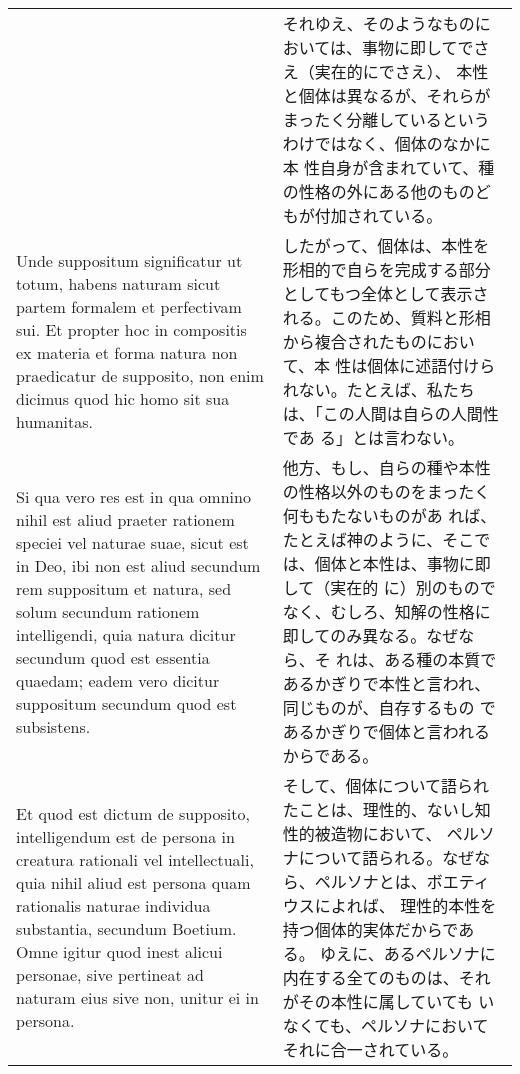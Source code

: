 \documentclass[10pt]{jsarticle} %
\begin{document}
\begin{longtable}{p{21em}p{21em}}
&

それゆえ、そのようなものにおいては、事物に即してでさえ（実在的にでさえ）、
 本性と個体は異なるが、それらがまったく分離しているというわけではなく、個体のなかに本
 性自身が含まれていて、種の性格の外にある他のものどもが付加されている。


\\

Unde suppositum significatur ut
totum, habens naturam sicut partem formalem et perfectivam sui. Et
propter hoc in compositis ex materia et forma natura non praedicatur de
supposito, non enim dicimus quod hic homo sit sua humanitas. 

&

したがって、個体は、本性を形相的で自らを完成する部分としてもつ全体として表示される。このため、質料と形相から複合されたものにおいて、本
 性は個体に述語付けられない。たとえば、私たちは、「この人間は自らの人間性であ
 る」とは言わない。


\\

Si qua vero
res est in qua omnino nihil est aliud praeter rationem speciei vel
naturae suae, sicut est in Deo, ibi non est aliud secundum rem
suppositum et natura, sed solum secundum rationem intelligendi, quia
natura dicitur secundum quod est essentia quaedam; eadem vero dicitur
suppositum secundum quod est subsistens. 


&

他方、もし、自らの種や本性の性格以外のものをまったく何ももたないものがあ
 れば、たとえば神のように、そこでは、個体と本性は、事物に即して（実在的
 に）別のものでなく、むしろ、知解の性格に即してのみ異なる。なぜなら、そ
 れは、ある種の本質であるかぎりで本性と言われ、同じものが、自存するもの
 であるかぎりで個体と言われるからである。


\\

Et quod est dictum de
supposito, intelligendum est de persona in creatura rationali vel
intellectuali, quia nihil aliud est persona quam rationalis naturae
individua substantia, secundum Boetium. 
Omne igitur quod inest alicui
personae, sive pertineat ad naturam eius sive non, unitur ei in
persona. 

&

そして、個体について語られたことは、理性的、ないし知性的被造物において、
 ペルソナについて語られる。なぜなら、ペルソナとは、ボエティウスによれば、
 理性的本性を持つ個体的実体だからである。
ゆえに、あるペルソナに内在する全てのものは、それがその本性に属していても
 いなくても、ペルソナにおいてそれに合一されている。


\end{longtable}
\end{document}
